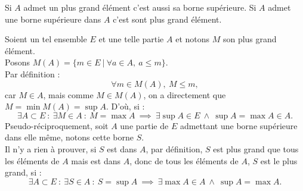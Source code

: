 \documentclass{article}
\begin{document}
\maketitle

\begin{question_kholle}
	[\noindent Soit $(E, \leq)$ un ensemble ordonné, et $A$ une partie non-vide de $E$. \\
    S'il existe $M\in A$ tel que $M = \max{A}$ alors $\sup{A}$ existe et $\max{A} = \sup{A}.$ \\
    S'il existe $S\in A$ tel que $S = \sup{A}$ alors $\max{A}$ existe et $\max{A} = \sup{A}.$
    ]
	{Si $A$ admet un plus grand élément c'est aussi sa borne supérieure. Si $A$ admet une borne supérieure dans $A$ c'est sont plus grand élément.}

Soient un tel ensemble $E$ et une telle partie $A$ et notons $M$ son plus grand élément. \\
Posons $M(A) = \{ m\in E \ | \ \forall a \in A, \ a \leq m\}$. \\
Par définition : 
\[
\forall m \in M(A), \ M \leq m,
\]
car $M\in A$, mais comme $M\in M(A)$, on a directement que $M = \min{M(A)} = \sup{A}.$
D'où, si : 
\[
\exists A \subset E  \ : \ \exists M \in A \ : \ M = \max{A} \ \implies \ \exists \sup{A} \in E \ \wedge \ \sup{A} = \max{A} \in A.
\] 
Pseudo-réciproquement, soit $A$ une partie de $E$ admettant une borne supérieure dans elle même, notons cette borne $S$. \\
Il n'y a rien à prouver, si $S$ est dans $A$, par définition, $S$ est plus grand que tous les éléments de $A$ mais est dans $A$, donc de tous les éléments de $A$, $S$ est le plus grand, si : 
\[
\exists A \subset E \ : \ \exists S \in A \ : \ S = \sup{A} \ \implies \ \exists \max{A} \in A \ \wedge \ \sup{A} = \max{A}.
\]
\end{question_kholle}
\end{document}
